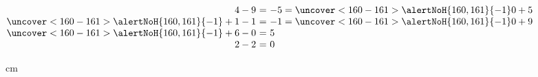 \begin{frame}
{{{\hfil\hfil$\begin{array}{@{}r@{~}c@{~}l}4-9 & = & -5=\uncover<160-161>{\alertNoH{160, 161}{{-1}}}0+5 \\ \uncover<160-161>{\alertNoH{160, 161}{{-1}}}+1-1 & = & -1=\uncover<160-161>{\alertNoH{160, 161}{{-1}}}0+9 \\ \uncover<160-161>{\alertNoH{160, 161}{{-1}}}+6-0 & = & 5 \\ 2-2 & = & 0 \\ \end{array}$}}}

 cm
\end{frame}